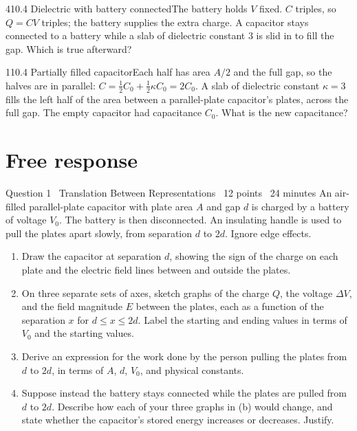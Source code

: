 \documentclass[11pt]{article}
\begin{document}
\begin{q}{4}{10.4 Dielectric with battery connected}{The battery holds $V$ fixed. $C$ triples, so $Q = CV$ triples; the battery supplies the extra charge.}
A capacitor stays connected to a battery while a slab of dielectric constant 3 is slid in to fill the gap. Which is true afterward?
\end{q}
\begin{q}{1}{10.4 Partially filled capacitor}{Each half has area $A/2$ and the full gap, so the halves are in parallel: $C = \tfrac12 C_0 + \tfrac12\kappa C_0 = 2C_0$.}
A slab of dielectric constant $\kappa = 3$ fills the left half of the area between a parallel-plate capacitor's plates, across the full gap. The empty capacitor had capacitance $C_0$. What is the new capacitance?
\end{q}

\section{Free response}

\begin{frq}{Question 1 \textperiodcentered\ Translation Between Representations \textperiodcentered\ 12 points \textperiodcentered\ 24 minutes}
An air-filled parallel-plate capacitor with plate area $A$ and gap $d$ is charged by a battery of voltage $V_0$. The battery is then disconnected. An insulating handle is used to pull the plates apart slowly, from separation $d$ to $2d$. Ignore edge effects.

\begin{enumerate}[label=(\alph*),leftmargin=2em,itemsep=4pt]
\item Draw the capacitor at separation $d$, showing the sign of the charge on each plate and the electric field lines between and outside the plates. 
\item On three separate sets of axes, sketch graphs of the charge $Q$, the voltage $\Delta V$, and the field magnitude $E$ between the plates, each as a function of the separation $x$ for $d \le x \le 2d$. Label the starting and ending values in terms of $V_0$ and the starting values. 
\item Derive an expression for the work done by the person pulling the plates from $d$ to $2d$, in terms of $A$, $d$, $V_0$, and physical constants. 
\item Suppose instead the battery stays connected while the plates are pulled from $d$ to $2d$. Describe how each of your three graphs in (b) would change, and state whether the capacitor's stored energy increases or decreases. Justify. 
\end{enumerate}
\end{frq}
\end{document}
